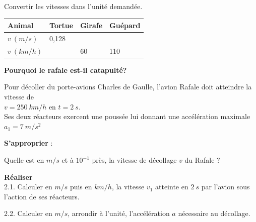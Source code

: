 \documentclass[11pt,a4paper]{article}
\newcommand{\cadreblanc}[1]{%
\medskip\framebox[\linewidth][c]{%
\rule{0mm}{#1mm}}\par
\medskip}
\begin{document}
\begin{center}
\begin{tabular}{|p{6cm}|C{3cm}|C{3cm}|C{3cm}|}
         
        
    \end{tabular}
\end{center}
\vfill
\newpage

 Convertir les vitesses dans l’unité demandée.\\\begin{center}
    

    \begin{tabular}{|p{3cm}|C{2cm}|C{2cm}|C{2cm}|}
         \hline
         Animal & Tortue & Girafe  & Guépard \\
         \hline 
         $v ~(m/s)$ &  0,128 &  &   \\
         \hline
         $v ~(km/h)$ &   & 60  &  110 \\
         \hline 
     
    \end{tabular}\end{center}


    


\begin{center}
    
\textbf{Pourquoi le rafale est-il catapulté? }
\end{center}

Pour décoller du porte-avions Charles de Gaulle, l'avion Rafale doit atteindre la vitesse de \\ $v=250~km/h$ en $t=2~s$. \\
Ses deux réacteurs exercent une poussée lui donnant une accélération maximale $a_1=7~m/s^2$ 


\textbf{ S'approprier} :

Quelle est en $m/s$ et à $10^{-1}$ près, la vitesse de décollage $v$ du Rafale ? 

\cadreblanc{15}

\textbf{ Réaliser} \\

2.1. Calculer en $m/s$ puis en $km/h$, la vitesse $v_1$ atteinte en $2~s$ par l'avion sous l'action de ses réacteurs. 

\cadreblanc{15}



2.2. Calculer en $m/s$, arrondir à l'unité, l'accélération $a$ nécessaire au décollage.   \\

\cadreblanc{15}
\end{document}
